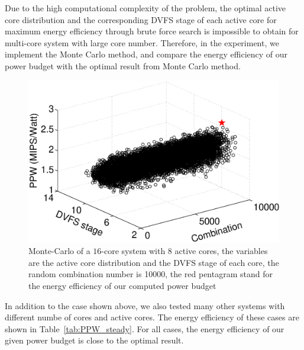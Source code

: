 Due to the high computational complexity of the problem, the optimal active core distribution and the corresponding DVFS stage of each active core for maximum energy efficiency through brute force search is impossible to obtain for multi-core system with large core number. Therefore, in the experiment, we implement the Monte Carlo method, and compare the energy efficiency of our power budget with the optimal result from Monte Carlo method. 
\begin{figure}
\centering
\includegraphics[width=1\linewidth]{fig/best_steady.eps}
\caption{Monte-Carlo of a $16$-core system with $8$ active cores, the variables are the active core distribution and the DVFS stage of each core, the random combination number is 10000, the red pentagram stand for the energy efficiency of our computed power budget}
\end{figure}





In addition to the case shown above, we also tested many other systems with different numbe of cores and active cores. The energy efficiency of these cases are shown in Table~\ref{tab:PPW_steady}. For all cases, the energy efficiency of our given power budget is close to the optimal result.





